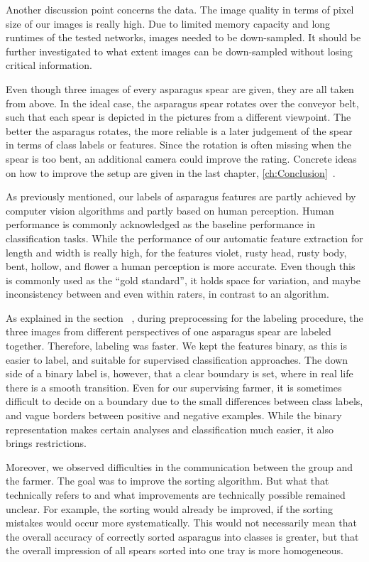 Another discussion point concerns the data. The image quality in terms of pixel size of our images is really high. Due to limited memory capacity and long runtimes of the tested networks, images needed to be down-sampled. It should be further investigated to what extent images can be down-sampled without losing critical information.

Even though three images of every asparagus spear are given, they are all taken from above. In the ideal case, the asparagus spear rotates over the conveyor belt, such that each spear is depicted in the pictures from a different viewpoint. The better the asparagus rotates, the more reliable is a later judgement of the spear in terms of class labels or features. Since the rotation is often missing when the spear is too bent, an additional camera could improve the rating. Concrete ideas on how to improve the setup are given in the last chapter, \ref{ch:Conclusion}~.

As previously mentioned, our labels of asparagus features are partly achieved by computer vision algorithms and partly based on human perception. Human performance is commonly acknowledged as the baseline performance in classification tasks. While the performance of our automatic feature extraction for length and width is really high, for the features violet, rusty head, rusty body, bent, hollow, and flower a human perception is more accurate. Even though this is commonly used as the \enquote{gold standard}, it holds space for variation, and maybe inconsistency between and even within raters, in contrast to an algorithm.

As explained in the section ~, during preprocessing for the labeling procedure, the three images from different perspectives of one asparagus spear are labeled together. Therefore, labeling was faster.
We kept the features binary, as this is easier to label, and suitable for supervised classification approaches. The down side of a binary label is, however, that a clear boundary is set, where in real life there is a smooth transition. Even for our supervising farmer, it is sometimes difficult to decide on a boundary due to the small differences between class labels, and vague borders between positive and negative examples. While the binary representation makes certain analyses and classification much easier, it also brings restrictions.

Moreover, we observed difficulties in the communication between the group and the farmer. The goal was to improve the sorting algorithm. But what that technically refers to and what improvements are technically possible remained unclear. For example, the sorting would already be improved, if the sorting mistakes would occur more systematically. This would not necessarily mean that the overall accuracy of correctly sorted asparagus into classes is greater, but that the overall impression of all spears sorted into one tray is more homogeneous.


